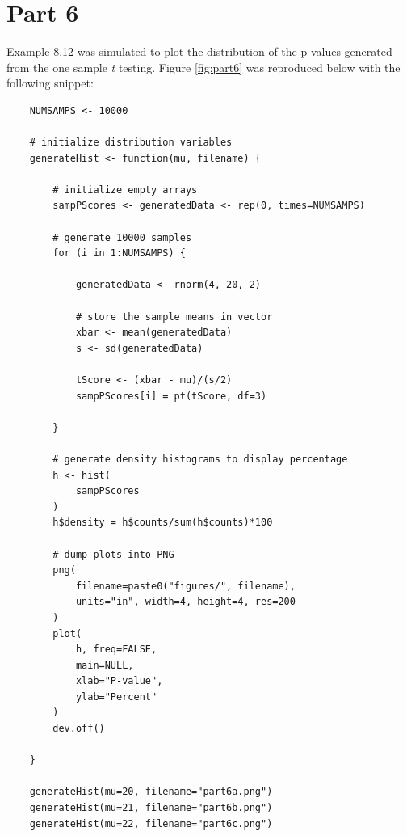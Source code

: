 \section{Part 6}
Example 8.12 was simulated to plot the distribution of the p-values generated from the one sample \textit{t} testing. Figure \ref{fig:part6} was reproduced below with the following snippet:

\begin{lstlisting}
    NUMSAMPS <- 10000

    # initialize distribution variables
    generateHist <- function(mu, filename) {

        # initialize empty arrays
        sampPScores <- generatedData <- rep(0, times=NUMSAMPS)

        # generate 10000 samples
        for (i in 1:NUMSAMPS) {

            generatedData <- rnorm(4, 20, 2)

            # store the sample means in vector
            xbar <- mean(generatedData)
            s <- sd(generatedData)

            tScore <- (xbar - mu)/(s/2)
            sampPScores[i] = pt(tScore, df=3)

        }

        # generate density histograms to display percentage
        h <- hist(
            sampPScores
        )
        h$density = h$counts/sum(h$counts)*100

        # dump plots into PNG
        png(
            filename=paste0("figures/", filename), 
            units="in", width=4, height=4, res=200
        )
        plot(
            h, freq=FALSE,
            main=NULL,
            xlab="P-value",
            ylab="Percent"
        )
        dev.off()

    }

    generateHist(mu=20, filename="part6a.png")
    generateHist(mu=21, filename="part6b.png")
    generateHist(mu=22, filename="part6c.png")
\end{lstlisting}

